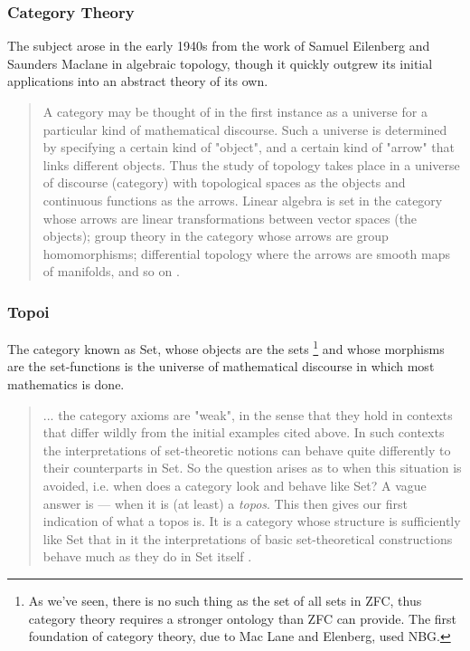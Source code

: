 \documentclass[12p]{article}
\theoremstyle{definition}
\begin{document}
\subsubsection{Category Theory}
The subject arose in the early 1940s from the work of Samuel Eilenberg and Saunders Maclane in algebraic topology, though it quickly outgrew its initial applications into an abstract theory of its own.

\begin{quote}
A category may be thought of in the first instance as a universe for a particular kind of mathematical discourse. Such a universe is determined by specifying a certain kind of "object", and a certain kind of "arrow" that links different objects. Thus the study of topology takes place in a universe of discourse (category) with topological spaces as the objects and continuous functions as the arrows. Linear algebra is set in the category whose arrows are linear transformations between vector spaces (the objects); group theory in the category whose arrows are group homomorphisms; differential topology where the arrows are smooth maps of manifolds, and so on \cite{goldblatt2014topoi}. 
\end{quote}
\subsubsection{Topoi}
The category known as \textsf{Set}, whose objects are the sets \footnote{As we've seen, there is no such thing as the set of all sets in ZFC, thus category theory requires a stronger ontology than ZFC can provide. The first foundation of category theory, due to Mac Lane and Elenberg, used NBG.} and whose morphisms are the set-functions is the universe of mathematical discourse in which most mathematics is done.
\begin{quote}
	... the category axioms are "weak", in the sense that they hold in contexts that differ wildly from the initial examples cited above. In such contexts the interpretations of set-theoretic notions can behave quite differently to their counterparts in \textsf{Set}. So the question arises as to when this situation is avoided, i.e. when does a category look and behave like \textsf{Set}? A vague answer is --- when it is (at least) a \textit{topos}. This then gives our first indication of what a topos is. It is a category whose structure is sufficiently like Set that in it the interpretations of basic set-theoretical constructions behave much as they do in \textsf{Set} itself \cite{goldblatt2014topoi}. 
\end{quote}
\end{document}
